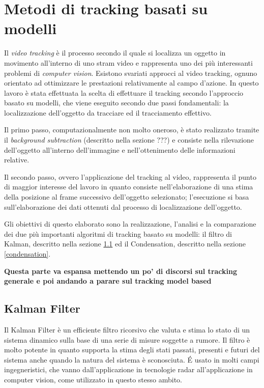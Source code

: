 \section{Metodi di tracking basati su modelli}
Il \textit{video tracking} è il processo secondo il quale si localizza un oggetto in movimento all'interno di uno stram video e rappresenta uno dei più interessanti problemi di \textit{computer vision}. Esistono svariati approcci al video tracking, ognuno orientato ad ottimizzare le prestazioni relativamente al campo d'azione. In questo lavoro è stata effettuata la scelta di effettuare il tracking secondo l'approccio basato su modelli, che viene eseguito secondo due passi fondamentali: la localizzazione dell'oggetto da tracciare ed il tracciamento effettivo.

Il primo passo, computazionalmente non molto oneroso, è stato realizzato tramite il \textit{background subtraction} (descritto nella sezione ???) e consiste nella rilevazione dell'oggetto all'interno dell'immagine e nell'ottenimento delle informazioni relative.

Il secondo passo, ovvero l'applicazione del tracking al video, rappresenta il punto di maggior interesse del lavoro in quanto consiste nell'elaborazione di una stima della posizione al frame successivo dell'oggetto selezionato; l'esecuzione si basa sull'elaborazione dei dati ottenuti dal processo di localizzazione dell'oggetto.

Gli obiettivi di questo elaborato sono la realizzazione, l'analisi e la comparazione dei due più importanti algoritmi di tracking basato su modelli: il filtro di Kalman, descritto nella sezione \ref{kalman} ed il Condensation, descritto nella sezione \ref{condensation}.

\textbf{Questa parte va espansa mettendo un po' di discorsi sul tracking generale e poi andando a parare sul tracking model based}

\subsection{Kalman Filter}\label{kalman}
Il Kalman Filter\cite{kalman-intro} è un efficiente filtro ricorsivo che valuta e stima lo stato di un sistema dinamico sulla base di una serie di misure soggette a rumore. Il filtro è molto potente in quanto supporta la stima degli stati passati, presenti e futuri del sistema anche quando la natura del sistema è sconosciuta. \'E usato in molti campi ingegneristici, che vanno dall'applicazione in tecnologie radar all'applicazione in computer vision, come utilizzato in questo stesso ambito.

